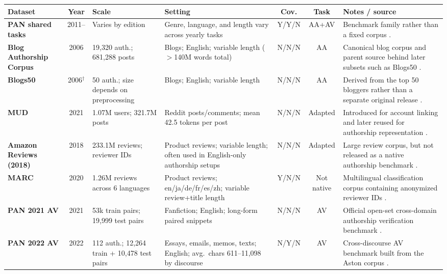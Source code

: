 \documentclass{article}
\begin{document}
\begin{table}[t]
\centering
\footnotesize
\setlength{\tabcolsep}{4pt}
\renewcommand{\arraystretch}{1.08}
\begin{tabular}{@{}L{2.45cm}cL{2.15cm}L{4.65cm}c c L{4.35cm}@{}}
\toprule
\textbf{Dataset} & \textbf{Year} & \textbf{Scale} & \textbf{Setting} & \textbf{Cov.} & \textbf{Task} & \textbf{Notes / source} \\
\midrule
\textbf{PAN shared tasks} & 2011-- & Varies by edition & Genre, language, and length vary across yearly tasks & Y/Y/N & AA+AV & Benchmark family rather than a fixed corpus \citep{pan_shared_tasks,potthast2016whowrote,bevendorff2020pan}. \\
\textbf{Blog Authorship Corpus} & 2006 & 19{,}320 auth.; 681{,}288 posts & Blogs; English; variable length ($>$140M words total) & N/N/N & AA & Canonical blog corpus and parent source behind later subsets such as Blogs50 \citep{schler2006effects}. \\
\textbf{Blogs50} & 2006$^\dagger$ & 50 auth.; size depends on preprocessing & Blogs; English; variable length & N/N/N & AA & Derived from the top 50 bloggers rather than a separate original release \citep{zhang-etal-2018-syntax}. \\
\textbf{MUD} & 2021 & 1.07M users; 321.7M posts & Reddit posts/comments; mean 42.5 tokens per post & N/N/N & Adapted & Introduced for account linking and later reused for authorship representation \citep{khan2021deepmetriclearningapproach,riverasoto2021luar}. \\
\textbf{Amazon Reviews (2018)} & 2018 & 233.1M reviews; reviewer IDs & Product reviews; variable length; often used in English-only authorship setups & N/N/N & Adapted & Large review corpus, but not released as a native authorship benchmark \citep{amazon_review_data_2018}. \\
\textbf{MARC} & 2020 & 1.26M reviews across 6 languages & Product reviews; en/ja/de/fr/es/zh; variable review+title length & Y/N/N & Not native & Multilingual classification corpus containing anonymized reviewer IDs \citep{keung2020marc}. \\
\textbf{PAN 2021 AV} & 2021 & 53k train pairs; 19{,}999 test pairs & Fanfiction; English; long-form paired snippets & N/N/N & AV & Official open-set cross-domain authorship verification benchmark \citep{pan2021av}. \\
\textbf{PAN 2022 AV} & 2022 & 112 auth.; 12{,}264 train + 10{,}478 test pairs & Essays, emails, memos, texts; English; avg.\ chars 611--11{,}098 by discourse & N/Y/N & AV & Cross-discourse AV benchmark built from the Aston corpus \citep{pan2022av}. \\

\end{tabular}
\end{table}
\end{document}
